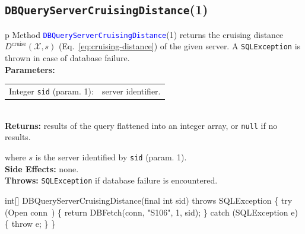 \subsection{{\tt{}\protect{}DBQueryServerCruisingDistance}(1)}
\begin{tabular}{p{\textwidth}}
\toprule
{}
Method \textcolor{blue}{{\tt{}\protect{}DBQueryServerCruisingDistance}}(1) returns the
cruising distance $D^\textrm{cruise}(\mathcal{X},s)$
(Eq.~\ref{eq:cruising-distance}) of the given server.
A {\tt{}SQLException} is thrown in case of database failure.\\
\midrule
\textbf{Parameters:}\\
\begin{tabular}{lp{116mm}}
Integer {\tt{}sid} (param. 1):&server identifier.
\end{tabular}\\
\textbf{Returns:} results of the query flattened into an integer array,
or {\tt{}null} if no results.


where $s$ is the server identified by {\tt{}sid} (param. 1).\\
\textbf{Side Effects:} none.\\
\textbf{Throws:} {\tt{}SQLException} if database failure is encountered.\\
\bottomrule
\end{tabular}
\nwenddocs{}\endmoddef{}
int[] DBQueryServerCruisingDistance(final int sid) throws SQLException \{
  try (\LA{}Open \code{}conn\edoc{}~{\nwtagstyle{}}\RA{}) \{
    return DBFetch(conn, "S106", 1, sid);
  \} catch (SQLException e) \{
    throw e;
  \}
\}
\eatline
{}\nwendcode{}\nwdocspar

